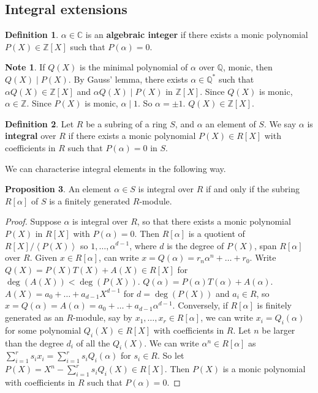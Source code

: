 \documentclass{article}
\newcommand{\Z}{\mathbb{Z}}
\newcommand{\Q}{\mathbb{Q}}
\newcommand{\C}{\mathbb{C}}
\newcommand{\rb}[1]{\left( #1 \right)}
\renewcommand{\sb}[1]{\left[ #1 \right]}
\newcommand{\ab}[1]{\left\langle #1 \right\rangle}
\theoremstyle{definition}\newtheorem{definition}{Definition}[subsection]
\theoremstyle{definition}\newtheorem{remark}[definition]{Remark}
\theoremstyle{definition}\newtheorem*{example}{Example}
\theoremstyle{definition}\newtheorem*{note}{Note}
\newtheorem{proposition}[definition]{Proposition}
\begin{document}
\subsection{Integral extensions}

\begin{definition}
$ \alpha \in \C $ is an \textbf{algebraic integer} if there exists a monic polynomial $ P\rb{X} \in \Z\sb{X} $ such that $ P\rb{\alpha} = 0 $.
\end{definition}

\begin{note}
If $ Q\rb{X} $ is the minimal polynomial of $ \alpha $ over $ \Q $, monic, then $ Q\rb{X} \mid P\rb{X} $. By Gauss' lemma, there exists $ \alpha \in \Q^* $ such that $ \alpha Q\rb{X} \in \Z\sb{X} $ and $ \alpha Q\rb{X} \mid P\rb{X} $ in $ \Z\sb{X} $. Since $ Q\rb{X} $ is monic, $ \alpha \in \Z $. Since $ P\rb{X} $ is monic, $ \alpha \mid 1 $. So $ \alpha = \pm 1 $. $ Q\rb{X} \in \Z\sb{X} $.
\end{note}

\begin{definition}
Let $ R $ be a subring of a ring $ S $, and $ \alpha $ an element of $ S $. We say $ \alpha $ is \textbf{integral} over $ R $ if there exists a monic polynomial $ P\rb{X} \in R\sb{X} $ with coefficients in $ R $ such that $ P\rb{\alpha} = 0 $ in $ S $.
\end{definition}

We can characterise integral elements in the following way.

\begin{proposition}
An element $ \alpha \in S $ is integral over $ R $ if and only if the subring $ R\sb{\alpha} $ of $ S $ is a finitely generated $ R $-module.
\end{proposition}

\begin{proof}
Suppose $ \alpha $ is integral over $ R $, so that there exists a monic polynomial $ P\rb{X} $ in $ R\sb{X} $ with $ P\rb{\alpha} = 0 $. Then $ R\sb{\alpha} $ is a quotient of $ R\sb{X} / \ab{P\rb{X}} $ so $ 1, \dots, \alpha^{d - 1} $, where $ d $ is the degree of $ P\rb{X} $, span $ R\sb{\alpha} $ over $ R $. Given $ x \in R\sb{\alpha} $, can write $ x = Q\rb{\alpha} = r_n\alpha^n + \dots + r_0 $. Write $ Q\rb{X} = P\rb{X}T\rb{X} + A\rb{X} \in R\sb{X} $ for $ \deg\rb{A\rb{X}} < \deg\rb{P\rb{X}} $. $ Q\rb{\alpha} = P\rb{\alpha}T\rb{\alpha} + A\rb{\alpha} $. $ A\rb{X} = a_0 + \dots + a_{d - 1}X^{d - 1} $ for $ d = \deg\rb{P\rb{X}} $ and $ a_i \in R $, so $ x = Q\rb{\alpha} = A\rb{\alpha} = a_0 + \dots + a_{d - 1}\alpha^{d - 1} $. Conversely, if $ R\sb{\alpha} $ is finitely generated as an $ R $-module, say by $ x_1, \dots, x_r \in R\sb{\alpha} $, we can write $ x_i = Q_i\rb{\alpha} $ for some polynomial $ Q_i\rb{X} \in R\sb{X} $ with coefficients in $ R $. Let $ n $ be larger than the degree $ d_i $ of all the $ Q_i\rb{X} $. We can write $ \alpha^n \in R\sb{\alpha} $ as $ \sum_{i = 1}^r s_ix_i = \sum_{i = 1}^r s_iQ_i\rb{\alpha} $ for $ s_i \in R $. So let $ P\rb{X} = X^n - \sum_{i = 1}^r s_iQ_i\rb{X} \in R\sb{X} $. Then $ P\rb{X} $ is a monic polynomial with coefficients in $ R $ such that $ P\rb{\alpha} = 0 $.
\end{proof}
\end{document}

